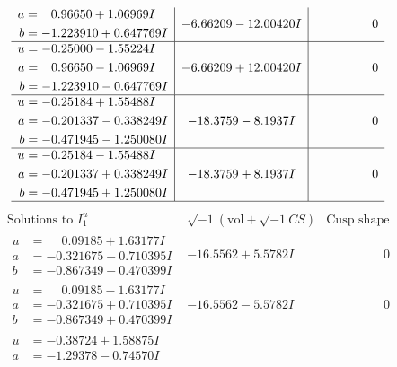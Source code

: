 \documentclass[1p]{elsarticle_modified}
\theoremstyle{definition}
\newcommand{\I}{\sqrt{-1}}
\begin{document}
$$\begin{array}{c|c|c}
\begin{aligned}
a &= \phantom{-}0.96650 + 1.06969 I \\
b &= -1.223910 + 0.647769 I\end{aligned}
 & -6.66209 - 12.00420 I & \phantom{-0.000000 } 0 \\ \hline\begin{aligned}
u &= -0.25000 - 1.55224 I \\
a &= \phantom{-}0.96650 - 1.06969 I \\
b &= -1.223910 - 0.647769 I\end{aligned}
 & -6.66209 + 12.00420 I & \phantom{-0.000000 } 0 \\ \hline\begin{aligned}
u &= -0.25184 + 1.55488 I \\
a &= -0.201337 - 0.338249 I \\
b &= -0.471945 - 1.250080 I\end{aligned}
 & -18.3759 - 8.1937 I & \phantom{-0.000000 } 0 \\ \hline\begin{aligned}
u &= -0.25184 - 1.55488 I \\
a &= -0.201337 + 0.338249 I \\
b &= -0.471945 + 1.250080 I\end{aligned}
 & -18.3759 + 8.1937 I & \phantom{-0.000000 } 0\\
 \hline 
 \end{array}$$\newpage$$\begin{array}{c|c|c}  
\text{Solutions to }I^u_{1}& \I (\text{vol} + \sqrt{-1}CS) & \text{Cusp shape}\\
 \hline 
\begin{aligned}
u &= \phantom{-}0.09185 + 1.63177 I \\
a &= -0.321675 - 0.710395 I \\
b &= -0.867349 - 0.470399 I\end{aligned}
 & -16.5562 + 5.5782 I & \phantom{-0.000000 } 0 \\ \hline\begin{aligned}
u &= \phantom{-}0.09185 - 1.63177 I \\
a &= -0.321675 + 0.710395 I \\
b &= -0.867349 + 0.470399 I\end{aligned}
 & -16.5562 - 5.5782 I & \phantom{-0.000000 } 0 \\ \hline\begin{aligned}
u &= -0.38724 + 1.58875 I \\
a &= -1.29378 - 0.74570 I \\

\end{aligned}
\end{array}$$
\end{document}
